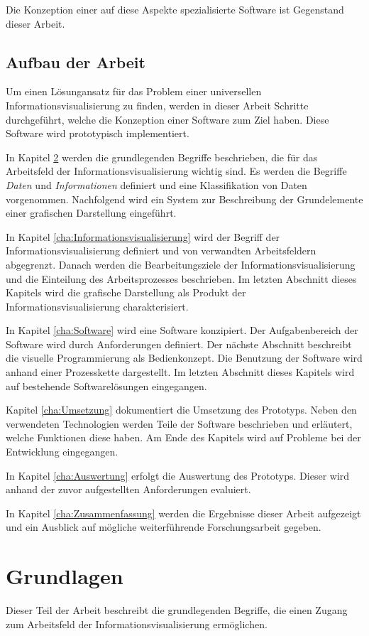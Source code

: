 \documentclass[a4paper, 
               12pt,
               DIV=calc,
               version=first,
               pdftex,
               headsepline,
               footsepline,
               bibtotocnumbered,
               liststotocnumbered]{scrreprt}
\begin{document}
Die Konzeption einer auf diese Aspekte spezialisierte Software ist Gegenstand dieser Arbeit.

\section{Aufbau der Arbeit}
Um einen Lösungansatz für das Problem einer universellen Informationsvisualisierung
zu finden, werden in dieser Arbeit Schritte durchgeführt, welche die Konzeption einer Software zum Ziel haben.
Diese Software wird prototypisch implementiert.

In Kapitel \ref{cha:Grundlagen} werden die grundlegenden Begriffe beschrieben, die für
das Arbeitsfeld der Informationsvisualisierung wichtig sind. Es werden die Begriffe
\textit{Daten} und \textit{Informationen} definiert und eine Klassifikation von Daten vorgenommen.
Nachfolgend wird ein System zur Beschreibung der Grundelemente einer grafischen Darstellung
eingeführt. 

In Kapitel \ref{cha:Informationsvisualisierung} wird der Begriff der Informationsvisualisierung
definiert und von verwandten Arbeitsfeldern abgegrenzt. Danach werden die Bearbeitungsziele
der Informationsvisualisierung und die Einteilung des Arbeitsprozesses
beschrieben. Im letzten Abschnitt dieses Kapitels wird die grafische Darstellung als Produkt
der Informationsvisualisierung charakterisiert.

In Kapitel \ref{cha:Software} wird eine Software konzipiert.
Der Aufgabenbereich der Software wird durch Anforderungen definiert. Der nächste Abschnitt beschreibt
die visuelle Programmierung als Bedienkonzept. Die Benutzung der Software wird anhand einer
Prozesskette dargestellt. Im letzten Abschnitt dieses Kapitels wird auf bestehende Softwarelösungen
eingegangen.

Kapitel \ref{cha:Umsetzung} dokumentiert die Umsetzung des Prototyps. Neben den verwendeten
Technologien werden Teile der Software beschrieben und erläutert, welche Funktionen diese haben.
Am Ende des Kapitels wird auf Probleme bei der Entwicklung eingegangen.

In Kapitel \ref{cha:Auswertung} erfolgt die Auswertung des Prototyps. Dieser wird anhand der zuvor
aufgestellten Anforderungen evaluiert.

In Kapitel \ref{cha:Zusammenfassung} werden die Ergebnisse dieser Arbeit aufgezeigt und ein
Ausblick auf mögliche weiterführende Forschungsarbeit gegeben.

\chapter{Grundlagen}
\label{cha:Grundlagen}
Dieser Teil der Arbeit beschreibt die grundlegenden Begriffe, die einen Zugang
zum Arbeitsfeld der Informationsvisualisierung ermöglichen.
\end{document}
